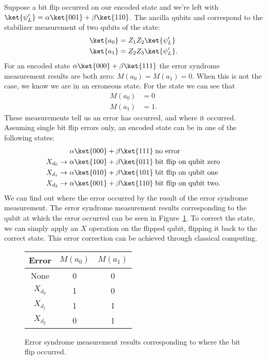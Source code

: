 \noindent
Suppose a bit flip occurred on our encoded state  and we're left with $\ket{\psi_L'} = \alpha\ket{001} + \beta\ket{110}$. The ancilla qubits  and  correspond to the stabilizer measurement of two qubits of the state:
\begin{align}
  \ket{a_0} &= Z_1Z_2\ket{\psi_L'} \\
  \ket{a_1} &= Z_2Z_3\ket{\psi_L'}.
\end{align}
For an encoded state $\alpha\ket{000} + \beta\ket{111}$ the error syndrome measurement results are both zero: $M(a_0) = M(a_1) = 0$. When this is not the case, we know we are in an erroneous state. For the state  we can see that
\begin{align}
  M(a_0) &= 0 \\
  M(a_1) &= 1.
\end{align}
These measurements tell us an error has occurred, and where it occurred. Assuming single bit flip errors only, an encoded state can be in one of the following states:
\begin{align}
  &\alpha\ket{000} + \beta\ket{111} \; \text{no error} \\
  X_{d_0} \rightarrow \  &\alpha\ket{100} + \beta\ket{011} \; \text{bit flip on qubit zero} \\
  X_{d_1} \rightarrow \  &\alpha\ket{010} + \beta\ket{101} \; \text{bit flip on qubit one} \\
  X_{d_2} \rightarrow \  &\alpha\ket{001} + \beta\ket{110} \; \text{bit flip on qubit two}.
\end{align}
We can find out where the error occurred by the result of the error syndrome measurement. The error syndrome measurement results corresponding to the qubit at which the error occurred can be seen in Figure~\ref{fig:zz_stabilizer_measurement_results}. To correct the state, we can simply apply an $X$ operation on the flipped qubit, flipping it back to the correct state. This error correction can be achieved through classical computing.
\begin{figure}[ht]
  \centering
  \begin{tabular}{c|c|c}
    Error & $M(a_0)$ & $M(a_1)$ \\ \hline
    None & 0 & 0 \\
    $X_{d_0}$ & 1 & 0 \\
    $X_{d_1}$ & 1 & 1 \\
    $X_{d_2}$ & 0 & 1
  \end{tabular}
  \caption{Error syndrome measurement results corresponding to where the bit flip occurred.}
  \label{fig:zz_stabilizer_measurement_results}
\end{figure}

